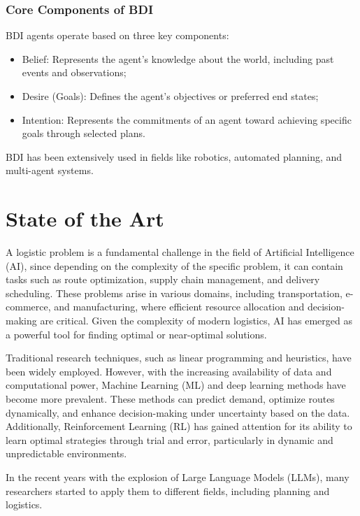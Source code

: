 \subsubsection{Core Components of BDI}
BDI agents operate based on three key components:
\begin{itemize}
  \item Belief: Represents the agent's knowledge about the world, including past
    events and observations;

  \item Desire (Goals): Defines the agent's objectives or preferred end states;

  \item Intention: Represents the commitments of an agent toward achieving
    specific goals through selected plans.
\end{itemize}

BDI has been extensively used in fields like robotics, automated planning, and multi-agent
systems.

\section{State of the Art}
\label{sec:state_of_the_art}

A logistic problem is a fundamental challenge in the field of Artificial
Intelligence (AI), since depending on the complexity of the specific problem, it
can contain tasks such as route optimization, supply chain management, and
delivery scheduling. These problems arise in various domains, including
transportation, e-commerce, and manufacturing, where efficient resource allocation
and decision-making are critical. Given the complexity of modern logistics, AI has
emerged as a powerful tool for finding optimal or near-optimal solutions.

Traditional research techniques, such as linear programming and heuristics, have
been widely employed. However, with the increasing availability of data and computational
power, Machine Learning (ML) and deep learning methods have become more
prevalent. These methods can predict demand, optimize routes dynamically, and enhance
decision-making under uncertainty based on the data. Additionally, Reinforcement
Learning (RL) has gained attention for its ability to learn optimal strategies through
trial and error, particularly in dynamic and unpredictable environments.

In the recent years with the explosion of Large Language Models (LLMs), many researchers
started to apply them to different fields, including planning and logistics.

